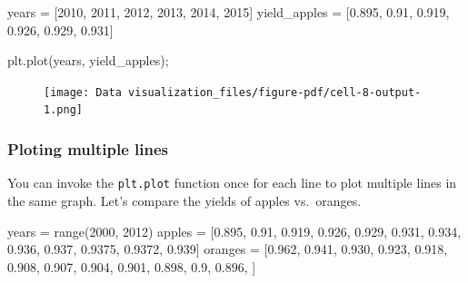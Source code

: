 \documentclass[
  letterpaper,
  DIV=11,
  numbers=noendperiod]{scrreprt}
\newenvironment{Shaded}{\begin{snugshade}}{\end{snugshade}}
\newcommand{\BuiltInTok}[1]{\textcolor[rgb]{0.00,0.23,0.31}{#1}}
\newcommand{\DecValTok}[1]{\textcolor[rgb]{0.68,0.00,0.00}{#1}}
\newcommand{\FloatTok}[1]{\textcolor[rgb]{0.68,0.00,0.00}{#1}}
\newcommand{\NormalTok}[1]{\textcolor[rgb]{0.00,0.23,0.31}{#1}}
\newcommand{\OperatorTok}[1]{\textcolor[rgb]{0.37,0.37,0.37}{#1}}
\begin{document}
\begin{Shaded}
\begin{Highlighting}[]
\NormalTok{years }\OperatorTok{=}\NormalTok{ [}\DecValTok{2010}\NormalTok{, }\DecValTok{2011}\NormalTok{, }\DecValTok{2012}\NormalTok{, }\DecValTok{2013}\NormalTok{, }\DecValTok{2014}\NormalTok{, }\DecValTok{2015}\NormalTok{]}
\NormalTok{yield\_apples }\OperatorTok{=}\NormalTok{ [}\FloatTok{0.895}\NormalTok{, }\FloatTok{0.91}\NormalTok{, }\FloatTok{0.919}\NormalTok{, }\FloatTok{0.926}\NormalTok{, }\FloatTok{0.929}\NormalTok{, }\FloatTok{0.931}\NormalTok{]}
\end{Highlighting}
\end{Shaded}

\begin{Shaded}
\begin{Highlighting}[]
\NormalTok{plt.plot(years, yield\_apples)}\OperatorTok{;}
\end{Highlighting}
\end{Shaded}

\begin{figure}[H]

{\centering \texttt{[image: Data visualization\_files/figure-pdf/cell-8-output-1.png]}

}

\end{figure}

\hypertarget{ploting-multiple-lines}{%
\subsubsection{Ploting multiple lines}\label{ploting-multiple-lines}}

You can invoke the \texttt{plt.plot} function once for each line to plot
multiple lines in the same graph. Let's compare the yields of apples
vs.~oranges.

\begin{Shaded}
\begin{Highlighting}[]
\NormalTok{years }\OperatorTok{=} \BuiltInTok{range}\NormalTok{(}\DecValTok{2000}\NormalTok{, }\DecValTok{2012}\NormalTok{)}
\NormalTok{apples }\OperatorTok{=}\NormalTok{ [}\FloatTok{0.895}\NormalTok{, }\FloatTok{0.91}\NormalTok{, }\FloatTok{0.919}\NormalTok{, }\FloatTok{0.926}\NormalTok{, }\FloatTok{0.929}\NormalTok{, }\FloatTok{0.931}\NormalTok{, }\FloatTok{0.934}\NormalTok{, }\FloatTok{0.936}\NormalTok{, }\FloatTok{0.937}\NormalTok{, }\FloatTok{0.9375}\NormalTok{, }\FloatTok{0.9372}\NormalTok{, }\FloatTok{0.939}\NormalTok{]}
\NormalTok{oranges }\OperatorTok{=}\NormalTok{ [}\FloatTok{0.962}\NormalTok{, }\FloatTok{0.941}\NormalTok{, }\FloatTok{0.930}\NormalTok{, }\FloatTok{0.923}\NormalTok{, }\FloatTok{0.918}\NormalTok{, }\FloatTok{0.908}\NormalTok{, }\FloatTok{0.907}\NormalTok{, }\FloatTok{0.904}\NormalTok{, }\FloatTok{0.901}\NormalTok{, }\FloatTok{0.898}\NormalTok{, }\FloatTok{0.9}\NormalTok{, }\FloatTok{0.896}\NormalTok{, ]}
\end{Highlighting}
\end{Shaded}
\end{document}
